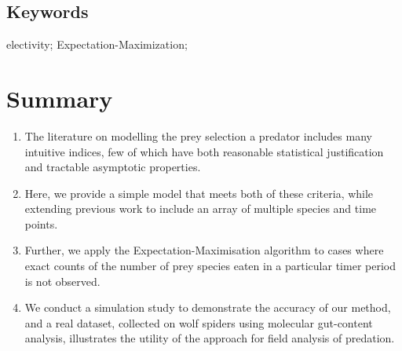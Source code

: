 \documentclass[12pt]{article}
\begin{document}
\subsection*{Keywords}
electivity; Expectation-Maximization; 

\newpage
\section*{Summary}
\label{sec:abstract}

\begin{enumerate}
\item The literature on modelling the prey selection a predator includes many intuitive indices, few of which have both reasonable statistical justification and tractable asymptotic properties.
\item Here, we provide a simple model that meets both of these criteria, while extending previous work to include an array of multiple species and time points.
\item Further, we apply the Expectation-Maximisation algorithm to cases where exact counts of the number of prey species eaten in a particular timer period is not observed.
\item We conduct a simulation study to demonstrate the accuracy of our method, and a real dataset, collected on wolf spiders using molecular gut-content analysis, illustrates the utility of the approach for field analysis of predation.
\end{enumerate}












\end{document}
